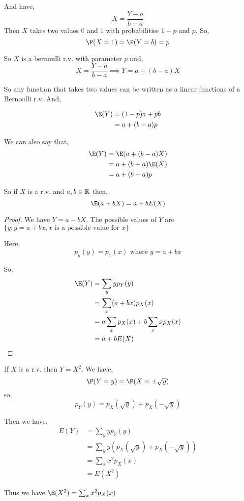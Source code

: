 And have, 
$$ X = \frac{Y - a}{b - a} $$ 
Then $X$ takes two values $0$ and $1$ with probabilities $1-p$ and $p$. So,  
$$ \P(X = 1) = \P(Y = b) = p $$ 

So $X$ is a bernoulli r.v. with parameter $p$ and, 
$$ X = \frac{Y - a}{b - a} \implies Y = a + (b - a)X $$ 

So any function that takes two values can be written as a linear functions of a Bernoulli r.v. And, 

\begin{align*}
	\E(Y) &= (1 - p)a + pb \\
	      &= a + (b - a)p 
\end{align*}

We can also say that, 
\begin{align*}
	\E(Y) &= \E(a + (b - a)X) \\
	      &= a + (b - a)\E(X) \\
	      &= a + (b - a)p 
\end{align*}


\begin{theorem}
	So if $X$ is a r.v. and $a, b \in \mathbb{R}$ then,  
	$$ \E(a + bX) = a + bE(X) $$ 
\end{theorem}
\begin{proof}
	We have $Y = a + bX$. The possible values of  $Y$ are  $\{y: y = a + bx, x \text{ is a possible value for $x$}\} $

	Here, 
	$$ p_y(y) = p_x(x) \text{ where $y = a +  bx$} $$ 

	So, 
	\begin{align*}
		\E(Y) &= \sum_y y p_Y(y)\\
 		&= \sum_x (a + bx) p_X(x)\\
 		&= a \sum_x  p_X(x) + b \sum_x  x p_X(x)\\
 		&= a  + b E(X)
	\end{align*}


\end{proof}
\begin{eg}
If $X$ is a r.v. then $Y = X^2$. We have, 
$$ \P(Y = y) = \P(X = \pm \sqrt{y}) $$  so, 
$$ p_Y(y) = p_X(\sqrt{y}) +  p_X(-\sqrt{y})  $$ 

Then we have,
\begin{align*}
	E(Y) &= \sum_y y p_Y(y)\\
	     &= \sum_y y (p_X(\sqrt{y}) +  p_X(-\sqrt{y})) \\
	     &= \sum_x x^2 p_X(x) \\
	     &= E(X^2)
\end{align*}

Thus we have $\E(X^2) = \sum_x x^2 p_X(x)$
\end{eg}

